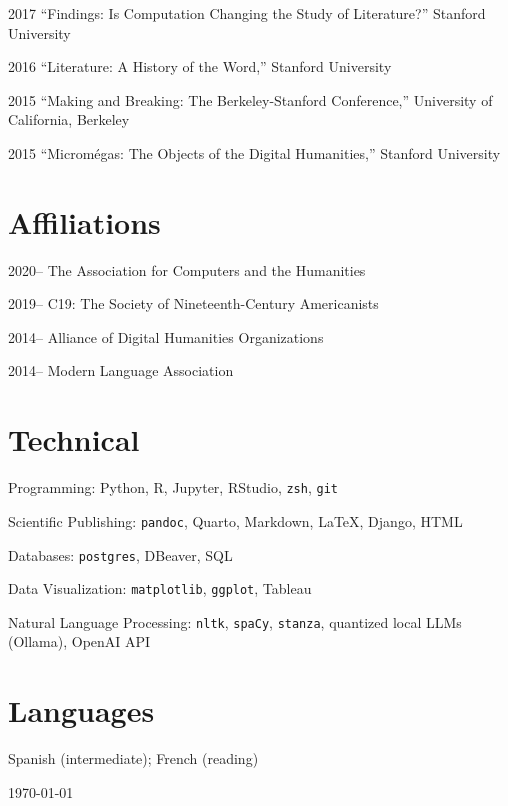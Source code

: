 \documentclass[12pt,letterpaper]{report}
\newcommand{\listitemspace}{0.25em}
\renewenvironment{itemize}
{\begin{list}{}{\setlength{\leftmargin}{0em}
                \setlength{\parskip}{0em}
                \setlength{\itemsep}{\listitemspace}
                \setlength{\parsep}{\listitemspace}}}
{\end{list}}
\begin{document}
\begin{tablist}
	\item[2017] \tab{}\enquote{Findings: Is Computation Changing the Study of Literature?} Stanford University
	\item[2016] \tab{}\enquote{Literature: A History of the Word,} Stanford University
	\item[2015] \tab{}\enquote{Making and Breaking: The Berkeley-Stanford Conference,} University of California, Berkeley
	\item[2015] \tab{}\enquote{Micromégas: The Objects of the Digital Humanities,} Stanford University
\end{tablist}


\section*{Affiliations}

\begin{tablist}
	\item[2020--] \tab{}The Association for Computers and the Humanities
	\item[2019--] \tab{}C19: The Society of Nineteenth-Century Americanists
	\item[2014--] \tab{}Alliance of Digital Humanities Organizations
	\item[2014--] \tab{}Modern Language Association
\end{tablist}

\section*{Technical}

\begin{itemize}
	\item Programming: Python, R, Jupyter, RStudio, \texttt{zsh}, \texttt{git}
	\item Scientific Publishing: \texttt{pandoc}, Quarto, Markdown, \LaTeX{}, Django, HTML
	\item Databases: \texttt{postgres}, DBeaver, SQL
	\item Data Visualization: \texttt{matplotlib}, \texttt{ggplot}, Tableau
	\item Natural Language Processing: \texttt{nltk}, \texttt{spaCy}, \texttt{stanza}, quantized local LLMs (Ollama), OpenAI API
\end{itemize}

\section*{Languages}

Spanish (intermediate); French (reading)

\vfill
\begin{center}
	\today
\end{center}
\end{document}
